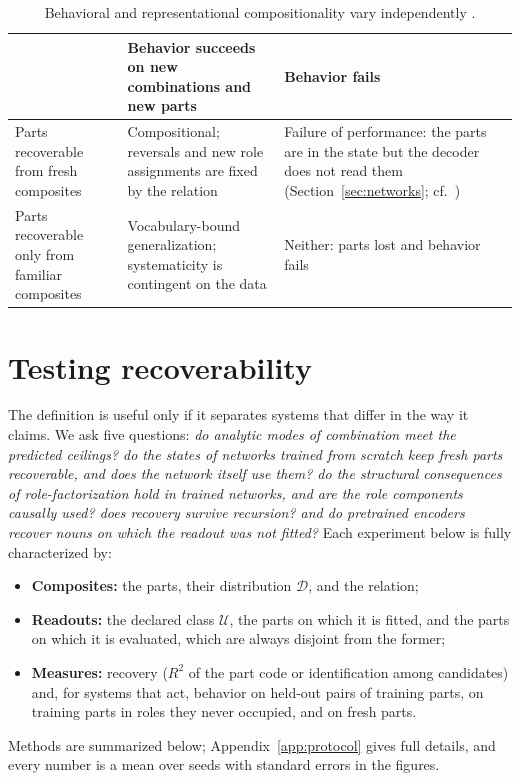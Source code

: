 \documentclass[10pt]{article}
\theoremstyle{plain}
\theoremstyle{remark}
\newcommand{\U}{\mathcal{U}}
\newcommand{\D}{\mathcal{D}}
\begin{document}
\begin{table}[t]
  \caption{Behavioral and representational compositionality vary independently \citep[cf.][]{vegner2025}.}
  \label{tab:twobytwo}
  \centering\small
  \begin{tabularx}{\linewidth}{@{}P{3.2cm}YY@{}}
    \toprule
    & Behavior succeeds on new combinations and new parts & Behavior fails \\
    \midrule
    Parts recoverable from fresh composites & Compositional; reversals and new role assignments are fixed by the relation & Failure of performance: the parts are in the state but the decoder does not read them (Section~\ref{sec:networks}; cf.\ \citealt{montero2021}) \\
    Parts recoverable only from familiar composites & Vocabulary-bound generalization; systematicity is contingent on the data \citep{chaabouni2020} & Neither: parts lost and behavior fails \\
    \bottomrule
  \end{tabularx}
\end{table}

\section{Testing recoverability}
\label{sec:experiments}

The definition is useful only if it separates systems that differ in the way it claims. We ask five questions: \emph{do analytic modes of combination meet the predicted ceilings? do the states of networks trained from scratch keep fresh parts recoverable, and does the network itself use them? do the structural consequences of role-factorization hold in trained networks, and are the role components causally used? does recovery survive recursion? and do pretrained encoders recover nouns on which the readout was not fitted?} Each experiment below is fully characterized by:
\begin{itemize}
  \item \textbf{Composites:} the parts, their distribution $\D$, and the relation;
  \item \textbf{Readouts:} the declared class $\U$, the parts on which it is fitted, and the parts on which it is evaluated, which are always disjoint from the former;
  \item \textbf{Measures:} recovery ($R^2$ of the part code or identification among candidates) and, for systems that act, behavior on held-out pairs of training parts, on training parts in roles they never occupied, and on fresh parts.
\end{itemize}
Methods are summarized below; Appendix~\ref{app:protocol} gives full details, and every number is a mean over seeds with standard errors in the figures.
\end{document}
